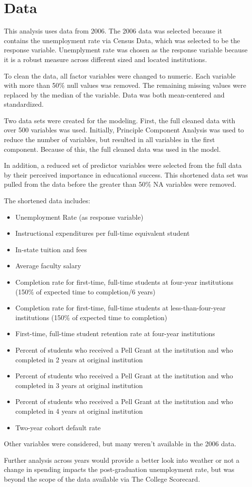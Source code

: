\section{Data}

This analysis uses data from 2006. The 2006 data was selected because it contains the unemployment rate via Census Data, which was selected to be the response variable. Unemplyment rate was chosen as the response variable because it is a robust measure across different sized and located institutions.

To clean the data, all factor variables were changed to numeric. Each variable with more than 50\% null values was removed. The remaining missing values were replaced by the median of the variable. Data was both mean-centered and standardized.

Two data sets were created for the modeling. First, the full cleaned data with over 500 variables was used. Initially, Principle Component Analysis was used to reduce the number of variables, but resulted in all variables in the first component. Because of this, the full cleaned data was used in the model.

In addition, a reduced set of predictor variables were selected from the full data by their perceived importance in educational success. This shortened data set was pulled from the data before the greater than 50\% NA variables were removed. 

The shortened data includes:

\begin{itemize}
\item Unemployment Rate (as response variable)
\item Instructional expenditures per full-time equivalent student
\item In-state tuition and fees
\item Average faculty salary
\item Completion rate for first-time, full-time students at four-year institutions (150\% of expected time to completion/6 years)
\item Completion rate for first-time, full-time students at less-than-four-year institutions (150\% of expected time to completion)
\item First-time, full-time student retention rate at four-year institutions
\item Percent of students who received a Pell Grant at the institution and who completed in 2 years at original institution
\item Percent of students who received a Pell Grant at the institution and who completed in 3 years at original institution
\item Percent of students who received a Pell Grant at the institution and who completed in 4 years at original institution
\item Two-year cohort default rate
\end{itemize}

Other variables were considered, but many weren't available in the 2006 data. 

Further analysis across years would provide a better look into weather or not a change in spending impacts the post-graduation unemployment rate, but was beyond the scope of the data available via The College Scorecard. 
